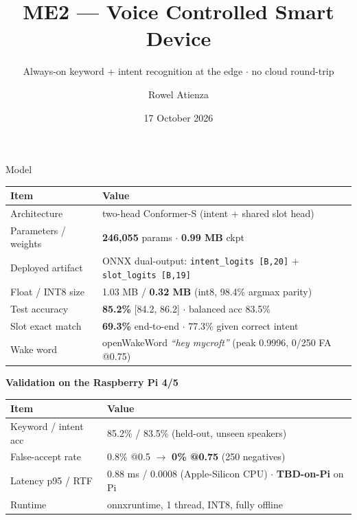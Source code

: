 \documentclass[aspectratio=169,10pt]{beamer}
\title[ME2 VCM]{ME2 --- Voice Controlled Smart Device}
\subtitle{Always-on keyword + intent recognition at the edge $\cdot$ no cloud round-trip}
\author{Rowel Atienza}
\date{17 October 2026}
\institute{Model \& Dataset \& Training on Apple-Silicon MPS \& Validation on RPi 4/5}
\newcommand{\TBD}{\textcolor{tbdgray}{\textbf{TBD-on-Pi}}}
\begin{document}
\begin{frame}{Model}
\small
\begin{table}
\centering
\begin{tabular}{@{}ll@{}}
\toprule
\textbf{Item} & \textbf{Value} \\
\midrule
Architecture & two-head Conformer-S (intent + shared slot head) \\
Parameters / weights & \textbf{246,055} params $\cdot$ \textbf{0.99 MB} ckpt \\
Deployed artifact & ONNX dual-output: \texttt{intent\_logits [B,20]} + \texttt{slot\_logits [B,19]} \\
Float / INT8 size & 1.03 MB / \textbf{0.32 MB} (int8, 98.4\% argmax parity) \\
Test accuracy & \textbf{85.2\%} [84.2, 86.2] $\cdot$ balanced acc 83.5\% \\
Slot exact match & \textbf{69.3\%} end-to-end $\cdot$ 77.3\% given correct intent \\
Wake word & openWakeWord \emph{``hey mycroft''} (peak 0.9996, 0/250 FA @0.75) \\
\bottomrule
\end{tabular}
\end{table}

\vspace{0.4em}
\textbf{Validation on the Raspberry Pi 4/5}
\begin{table}
\centering
\small
\begin{tabular}{@{}ll@{}}
\toprule
\textbf{Item} & \textbf{Value} \\
\midrule
Keyword / intent acc & 85.2\% / 83.5\% (held-out, unseen speakers) \\
False-accept rate & 0.8\% @0.5 $\rightarrow$ \textbf{0\% @0.75} (250 negatives) \\
Latency p95 / RTF & 0.88 ms / 0.0008 (Apple-Silicon CPU) $\cdot$ \TBD{} on Pi \\
Runtime & onnxruntime, 1 thread, INT8, fully offline \\
\bottomrule
\end{tabular}
\end{table}
\end{frame}
\end{document}
